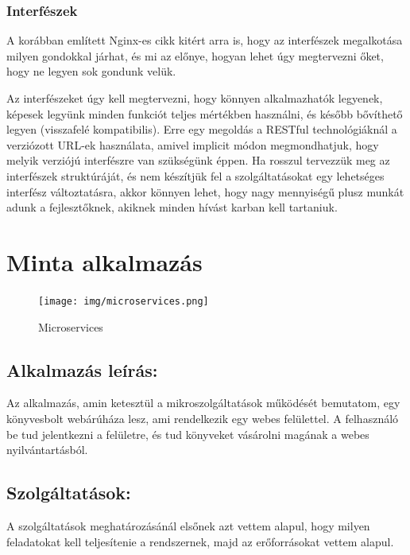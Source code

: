 \documentclass[11pt,magyar,a4paper,twoside,]{report}
\begin{document}
\subsection{Interfészek}\label{interfuxe9szek}

A korábban említett Nginx-es cikk kitért arra is, hogy az interfészek
megalkotása milyen gondokkal járhat, és mi az előnye, hogyan lehet úgy
megtervezni őket, hogy ne legyen sok gondunk velük.

Az interfészeket úgy kell megtervezni, hogy könnyen alkalmazhatók
legyenek, képesek legyünk minden funkciót teljes mértékben használni, és
később bővíthető legyen (visszafelé kompatibilis). Erre egy megoldás a
RESTful technológiáknál a verziózott URL-ek használata, amivel implicit
módon megmondhatjuk, hogy melyik verziójú interfészre van szükségünk
éppen. Ha rosszul tervezzük meg az interfészek struktúráját, és nem
készítjük fel a szolgáltatásokat egy lehetséges interfész változtatásra,
akkor könnyen lehet, hogy nagy mennyiségű plusz munkát adunk a
fejlesztőknek, akiknek minden hívást karban kell tartaniuk.

\chapter{Minta alkalmazás}\label{minta-alkalmazuxe1s}

\begin{figure}[H]
\centering
\texttt{[image: img/microservices.png]}
\caption{Microservices}
\end{figure}

\section{Alkalmazás leírás:}\label{alkalmazuxe1s-leuxedruxe1s}

Az alkalmazás, amin ketesztül a mikroszolgáltatások működését bemutatom,
egy könyvesbolt webárúháza lesz, ami rendelkezik egy webes felülettel. A
felhasználó be tud jelentkezni a felületre, és tud könyveket vásárolni
magának a webes nyilvántartásból.

\section{Szolgáltatások:}\label{szolguxe1ltatuxe1sok}

A szolgáltatások meghatározásánál elsőnek azt vettem alapul, hogy milyen
feladatokat kell teljesítenie a rendszernek, majd az erőforrásokat
vettem alapul.
\end{document}
